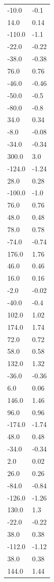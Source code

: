 \begin{longtable}{ll}
-10.0 & -0.1 \\
14.0 & 0.14 \\
-110.0 & -1.1 \\
-22.0 & -0.22 \\
-38.0 & -0.38 \\
76.0 & 0.76 \\
-46.0 & -0.46 \\
-50.0 & -0.5 \\
-80.0 & -0.8 \\
34.0 & 0.34 \\
-8.0 & -0.08 \\
-34.0 & -0.34 \\
300.0 & 3.0 \\
-124.0 & -1.24 \\
28.0 & 0.28 \\
-100.0 & -1.0 \\
76.0 & 0.76 \\
48.0 & 0.48 \\
78.0 & 0.78 \\
-74.0 & -0.74 \\
176.0 & 1.76 \\
46.0 & 0.46 \\
16.0 & 0.16 \\
-2.0 & -0.02 \\
-40.0 & -0.4 \\
102.0 & 1.02 \\
174.0 & 1.74 \\
72.0 & 0.72 \\
58.0 & 0.58 \\
132.0 & 1.32 \\
-36.0 & -0.36 \\
6.0 & 0.06 \\
146.0 & 1.46 \\
96.0 & 0.96 \\
-174.0 & -1.74 \\
48.0 & 0.48 \\
-34.0 & -0.34 \\
2.0 & 0.02 \\
26.0 & 0.26 \\
-84.0 & -0.84 \\
-126.0 & -1.26 \\
130.0 & 1.3 \\
-22.0 & -0.22 \\
38.0 & 0.38 \\
-112.0 & -1.12 \\
38.0 & 0.38 \\
144.0 & 1.44 \\

\end{longtable}
